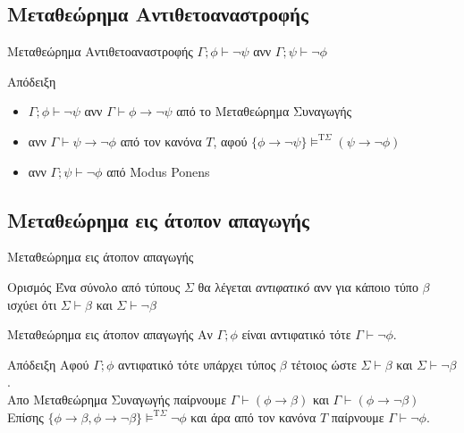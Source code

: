 \documentclass{beamer}
\begin{document}
\subsection{Μεταθεώρημα Αντιθετοαναστροφής}

\begin{frame}{Μεταθεώρημα Αντιθετοαναστροφής}
  $\Gamma ; \phi \vdash \neg\psi$ ανν $\Gamma ; \psi \vdash \neg\phi$
  \begin{block}{Απόδειξη}
    \begin{itemize}
      \item[] $\Gamma ; \phi \vdash \neg\psi$ ανν $\Gamma \vdash \phi \rightarrow \neg\psi$ από το Μεταθεώρημα Συναγωγής
      \item[] ανν $\Gamma \vdash \psi \rightarrow \neg\phi$ από τον κανόνα $T$, αφού $\{\phi \rightarrow \neg\psi\} \models^{\textrm{T}\Sigma} (\psi \rightarrow \neg\phi)$
      \item[] ανν $\Gamma ; \psi \vdash \neg\phi$ από Modus Ponens
    \end{itemize}
  \end{block}
\end{frame}

\subsection{Μεταθεώρημα εις άτοπον απαγωγής}

\begin{frame}{Μεταθεώρημα εις άτοπον απαγωγής}
  \begin{block}{Ορισμός}
    Ένα σύνολο από τύπους $\Sigma$ θα λέγεται \textit{αντιφατικό} ανν για κάποιο τύπο $\beta$  ισχύει ότι $\Sigma \vdash \beta$ και $\Sigma \vdash \neg\beta$
  \end{block}
  
  \begin{block}{Μεταθεώρημα εις άτοπον απαγωγής}
    Αν $\Gamma ; \phi$ είναι αντιφατικό τότε $\Gamma \vdash \neg\phi$.
  \end{block}
  
  \begin{block}{Απόδειξη}
    Αφού $\Gamma ; \phi$ αντιφατικό τότε υπάρχει τύπος $\beta$ τέτοιος ώστε $\Sigma \vdash \beta$ και $\Sigma \vdash \neg\beta$.\\
    Απο Μεταθεώρημα Συναγωγής παίρνουμε $\Gamma \vdash (\phi \rightarrow \beta)$ και $\Gamma \vdash (\phi \rightarrow \neg\beta)$\\
    Επίσης $\{\phi \rightarrow \beta, \phi \rightarrow \neg\beta\} \models^{\textrm{T}\Sigma} \neg\phi$ και άρα από τον κανόνα $T$ παίρνουμε $\Gamma \vdash \neg\phi$.
  \end{block}
\end{frame}
\end{document}
